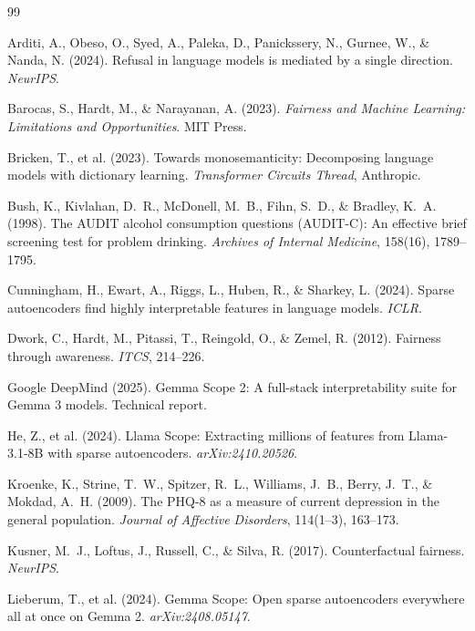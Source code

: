 \documentclass[11pt]{article}
\begin{document}

\begin{thebibliography}{99}

 Arditi, A., Obeso, O., Syed, A., Paleka, D., Panickssery, N., Gurnee, W., \& Nanda, N. (2024). Refusal in language models is mediated by a single direction. \textit{NeurIPS}.

 Barocas, S., Hardt, M., \& Narayanan, A. (2023). \textit{Fairness and Machine Learning: Limitations and Opportunities}. MIT Press.

 Bricken, T., et al. (2023). Towards monosemanticity: Decomposing language models with dictionary learning. \textit{Transformer Circuits Thread}, Anthropic.

 Bush, K., Kivlahan, D.~R., McDonell, M.~B., Fihn, S.~D., \& Bradley, K.~A. (1998). The AUDIT alcohol consumption questions (AUDIT-C): An effective brief screening test for problem drinking. \textit{Archives of Internal Medicine}, 158(16), 1789--1795.

 Cunningham, H., Ewart, A., Riggs, L., Huben, R., \& Sharkey, L. (2024). Sparse autoencoders find highly interpretable features in language models. \textit{ICLR}.

 Dwork, C., Hardt, M., Pitassi, T., Reingold, O., \& Zemel, R. (2012). Fairness through awareness. \textit{ITCS}, 214--226.

 Google DeepMind (2025). Gemma Scope 2: A full-stack interpretability suite for Gemma 3 models. Technical report.

 He, Z., et al. (2024). Llama Scope: Extracting millions of features from Llama-3.1-8B with sparse autoencoders. \textit{arXiv:2410.20526}.

 Kroenke, K., Strine, T.~W., Spitzer, R.~L., Williams, J.~B., Berry, J.~T., \& Mokdad, A.~H. (2009). The PHQ-8 as a measure of current depression in the general population. \textit{Journal of Affective Disorders}, 114(1--3), 163--173.

 Kusner, M.~J., Loftus, J., Russell, C., \& Silva, R. (2017). Counterfactual fairness. \textit{NeurIPS}.

 Lieberum, T., et al. (2024). Gemma Scope: Open sparse autoencoders everywhere all at once on Gemma 2. \textit{arXiv:2408.05147}.


\end{thebibliography}
\end{document}
